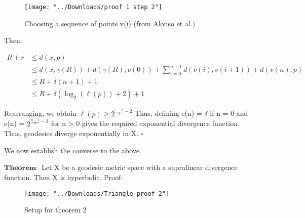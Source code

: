 \documentclass[11pt]{article}
\newcommand{\vs}{\vskip10pt}
\begin{document}
		\begin{figure}[h]
		\centering
		\texttt{[image: "../Downloads/proof 1 step 2"]}
		\caption{Choosing a sequence of points v(i) (from Alonso et al.)}
		\label{Figure 5: Choosing a sequence of points v(i) (Alonso et al.)}
		
	\end{figure}
	
	Then: 
	 
	 \begin{align*}
	 R+r &\leq d(x, p) \\
	 &\leq d(x, \gamma(R)) + d(\gamma(R), v(0))+ \sum_{i=0}^{n-1} d(v(i), v(i+1)) + d(v(n), p) \\
	 &\leq R + \delta (n+1) + 1 \\
	 &\leq R + \delta (\log_2(\ell(p))+2) + 1
	 \end{align*}
	
	 Rearranging, we obtain $\ell(p) \geq 2^{\frac{r-1}{\delta} - 2}$
	 \vs
	 Thus, defining e(n) = $\delta$ if n = 0 and e(n) = $2^{\frac{n-1}{\delta} - 3}$ for n > 0 gives the required exponential divergence function. Thus, geodesics diverge exponentially in X. 
	 $\square$
	  
	\vs 
	 
 	We now establish the converse to the above.
 	\vs
 	
 	$\mathbf{Theorem: }$ Let X be a geodesic metric space with a supralinear divergence function. Then X is hyperbolic. 
 	\vs
 	Proof: 
 	
 		\begin{figure}[h]
 		\centering
 		\texttt{[image: "../Downloads/Triangle proof 2"]}
 		\caption{Setup for theorem 2}
 		\label{Figure 2: Setup for theorem 2}
 		
 	\end{figure}
 	
\end{document}
